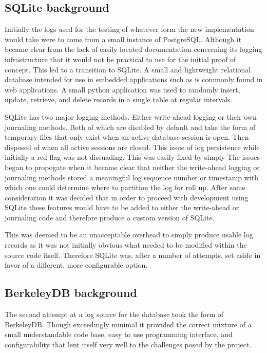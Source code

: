 \documentclass{article}
\begin{document}
\subsection{SQLite background}
Initially the logs used for the testing of whatever form the new implementation would take were to come from a small instance of PostgreSQL. Although it became clear from the lack of easily located documentation concerning its logging infrastructure that it would not be practical to use for the initial proof of concept. This led to a transition to SQLite. A small and lightweight relational database intended for use in embedded applications such as is commonly found in web applications. A small python application was used to randomly insert, update, retrieve, and delete records in a single table at regular intervals.
 
SQLite has two major logging methods. Either write-ahead logging or their own journaling methods. Both of which are disabled by default and take the form of temporary files that only exist when an active database session is open. Then disposed of when all active sessions are closed. This issue of log persistence while initially a red flag was not dissuading. This was easily fixed by simply The issues began to propogate when it became clear that neither the write-ahead logging or journaling methods stored a meaningful log sequence number or timestamp with which one could determine where to partition the log for roll up. After some consideration it was decided that in order to proceed with development using SQLite these features would have to be added to either the write-ahead or journaling code and therefore produce a custom version of SQLite.

This was deemed to be an unacceptable overhead to simply produce usable log records as it was not initially obvious what needed to be modified within the source code itself. Therefore SQLite was, after a number of attempts, set aside in favor of a different, more configurable option.

\subsection{BerkeleyDB background}
The second attempt at a log source for the database took the form of BerkeleyDB. Though exceedingly minimal it provided the correct mixture of a small understandable code base, easy to use programming interface, and configurability that lent itself very well to the challenges posed by the project.
\end{document}
